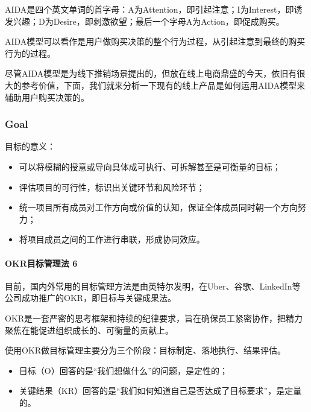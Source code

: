 \documentclass[letterpaper,11pt,english]{sphinxmanual}
\begin{document}
AIDA是四个英文单词的首字母：A为Attention，即引起注意；I为Interest，即诱发兴趣；D为Desire，即刺激欲望；最后一个字母A为Action，即促成购买。

AIDA模型可以看作是用户做购买决策的整个行为过程，从引起注意到最终的购买行为的过程。

尽管AIDA模型是为线下推销场景提出的，但放在线上电商鼎盛的今天，依旧有很大的参考价值，下面，我们就来分析一下现有的线上产品是如何运用AIDA模型来辅助用户购买决策的。


\subsubsection{Goal}
\label{\detokenize{chapter_idea/goal:goal}}\label{\detokenize{chapter_idea/goal::doc}}
目标的意义：
\begin{itemize}
\item {} 
可以将模糊的授意或导向具体成可执行、可拆解甚至是可衡量的目标；

\item {} 
评估项目的可行性，标识出关键环节和风险环节；

\item {} 
统一项目所有成员对工作方向或价值的认知，保证全体成员同时朝一个方向努力；

\item {} 
将项目成员之间的工作进行串联，形成协同效应。

\end{itemize}


\paragraph{OKR目标管理法 6\sphinxfootnotemark[355]}
\label{\detokenize{chapter_idea/goal:okr-6}}%
\begin{footnotetext}[355]\sphinxAtStartFootnote
{}
%
\end{footnotetext}\ignorespaces 
目前，国内外常用的目标管理方法是由英特尔发明，在Uber、谷歌、LinkedIn等公司成功推广的OKR，即目标与关键成果法。

OKR是一套严密的思考框架和持续的纪律要求，旨在确保员工紧密协作，把精力聚焦在能促进组织成长的、可衡量的贡献上。

使用OKR做目标管理主要分为三个阶段：目标制定、落地执行、结果评估。
\begin{itemize}
\item {} 
目标（O）回答的是“我们想做什么”的问题，是定性的；

\item {} 
关键结果（KR）回答的是“我们如何知道自己是否达成了目标要求”，是定量的。

\end{itemize}
\end{document}
